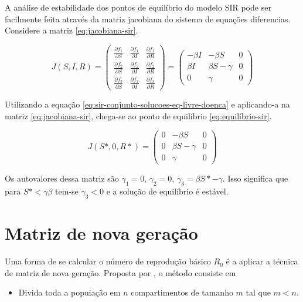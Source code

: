 A análise de estabilidade dos pontos de equilíbrio do modelo SIR pode ser facilmente 
feita através da matriz jacobiana do sistema de equações diferencias. 
Considere a matriz \ref{eq:jacobiana-sir}.

\begin{equation}\label{eq:jacobiana-sir}
J(S,I,R) = 
\begin{pmatrix}
\frac{\partial f_1}{\partial S} & \frac{\partial f_1}{\partial I} & \frac{\partial f_1}{\partial R} \\[0.5em]
\frac{\partial f_2}{\partial S} & \frac{\partial f_2}{\partial I} & \frac{\partial f_2}{\partial R} \\[0.5em]
\frac{\partial f_3}{\partial S} & \frac{\partial f_3}{\partial I} & \frac{\partial f_3}{\partial R}
\end{pmatrix}
=
\begin{pmatrix}
-\beta I & -\beta S & 0 \\
\beta I & \beta S - \gamma & 0 \\
0 & \gamma & 0
\end{pmatrix}
\end{equation}

Utilizando a equação \ref{eq:sir-conjunto-solucoes-eq-livre-doenca} e aplicando-a
na matriz \ref{eq:jacobiana-sir}, chega-se ao ponto de equilíbrio 
\ref{eq:equilíbrio-sir}.

\begin{equation}\label{eq:equilíbrio-sir}
J(S*,0,R*)
=
\begin{pmatrix}
0 & -\beta S & 0 \\
0 & \beta S - \gamma & 0 \\
0 & \gamma & 0
\end{pmatrix}
\end{equation}

Os autovalores dessa matriz são $\gamma_1=0$, $\gamma_2=0$, $\gamma_3=\beta S* - \gamma$. 
Isso significa que para $S* < \gamma \beta$ tem-se $\gamma_3 < 0$ e a solução 
de equilíbrio é estável.

\section{Matriz de nova geração}

Uma forma de se calcular o número de reprodução básico $R_0$ é a aplicar a técnica
de matriz de nova geração. Proposta por \cite{diekmann:1990-matriz-de-nova-geracao},
o método consiste em 

\begin{itemize}
    \item Divida toda a popuiação em $n$ compartimentos de tamanho $m$ tal que 
    $m < n$.

\end{itemize}

